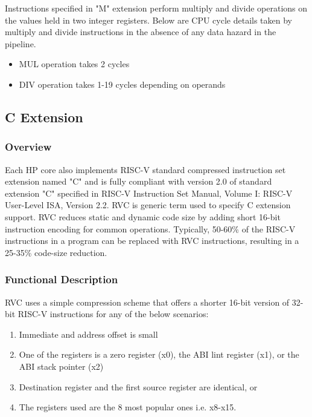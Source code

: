 \documentclass[main\_\_EN.tex]{subfiles}
\begin{document}
Instructions specified in "M" extension perform multiply and divide operations on the values held in two integer registers. Below are CPU cycle details taken by multiply and divide instructions in the absence of any data hazard in the pipeline.

\begin{itemize}
    \item MUL operation takes 2 cycles
    \item DIV operation takes 1-19 cycles depending on operands
\end{itemize}


\subsection{C Extension}
\label{sec:riscvcpu-cext}

\subsubsection{Overview}
\label{sec:riscvcpu-cext-overview}

Each HP core also implements RISC-V standard compressed instruction set extension named "C" and is fully compliant with version 2.0 of standard extension "C" specified in RISC-V Instruction Set Manual, Volume I: RISC-V User-Level ISA, Version 2.2. RVC is generic term used to specify C extension support. RVC reduces static and dynamic code size by adding short 16-bit instruction encoding for common operations. Typically, 50-60\% of the RISC-V instructions in a program can be replaced with RVC instructions, resulting in a 25-35\% code-size reduction.

\subsubsection{Functional Description}
\label{sec:riscvcpu-cext-func-descr}

RVC uses a simple compression scheme that offers a shorter 16-bit version of 32-bit RISC-V instructions for any of the below scenarios:

\begin{enumerate}
    \item Immediate and address offset is small
    \item One of the registers is a zero register (x0), the ABI lint register (x1), or the ABI stack pointer (x2)
    \item Destination register and the first source register are identical, or
    \item The registers used are the 8 most popular ones i.e. x8-x15.
\end{enumerate}
\end{document}
